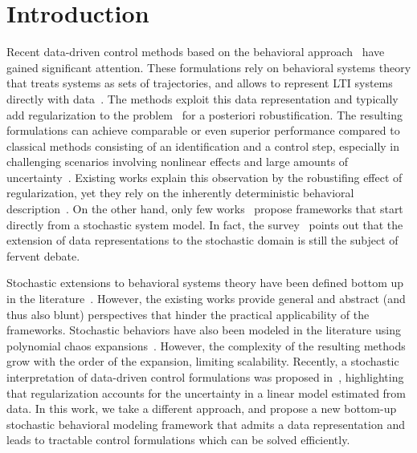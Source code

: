 \documentclass[letterpaper, 10 pt, conference]{ieeeconf}
\begin{document}
\section{Introduction}
Recent data-driven control methods based on the behavioral approach~\cite{coulson2019data,coulson2021distributionally,berberich2020data,breschi2023data,depersis2019formulas} have gained significant attention.
These formulations rely on behavioral systems theory that treats systems as sets of trajectories, and allows to represent \acrfull{LTI} systems directly with data~\cite{willems1997introduction,willems2005note}.
The methods exploit this data representation and typically add regularization to the problem~\cite{dorfler2022bridging,markovsky2022data} for a posteriori robustification. 
The resulting formulations can achieve comparable or even superior performance compared to classical methods consisting of an identification and a control step, especially in challenging scenarios involving nonlinear effects and large amounts of uncertainty~\cite{dorfler2022bridging,markovsky2021behavioral}.
Existing works explain this observation by the robustifing effect of regularization, yet they rely on the inherently deterministic behavioral description~\cite{huang2021quadratic,coulson2021distributionally,berberich2020data}.
On the other hand, only few works~\cite{willems2012open,baggio2017lti,faulwasser2023behavioral,pan2022stochastic,fiedler2023probabilistic,chiuso2025harnessing} propose frameworks that start directly from a stochastic system model.
In fact, the survey~\cite{markovsky2021behavioral} points out that the extension of data representations to the stochastic domain is still the subject of fervent debate.



Stochastic extensions to behavioral systems theory have been defined bottom up in the literature~\cite{willems2012open,baggio2017lti}.
However, the existing works provide general and abstract (and thus also blunt) perspectives that hinder the practical applicability of the frameworks.
Stochastic behaviors have also been modeled in the literature using polynomial chaos expansions~\cite{faulwasser2023behavioral,pan2022stochastic}.
However, the complexity of the resulting methods grow with the order of the expansion, limiting scalability.
Recently, a stochastic interpretation of data-driven control formulations was proposed in~\cite{chiuso2025harnessing}, highlighting that regularization accounts for the uncertainty in a linear model estimated from data.
In this work, we take a different approach, and propose a new bottom-up stochastic behavioral modeling framework that admits a data representation and leads to tractable control formulations which can be solved efficiently.
\end{document}
